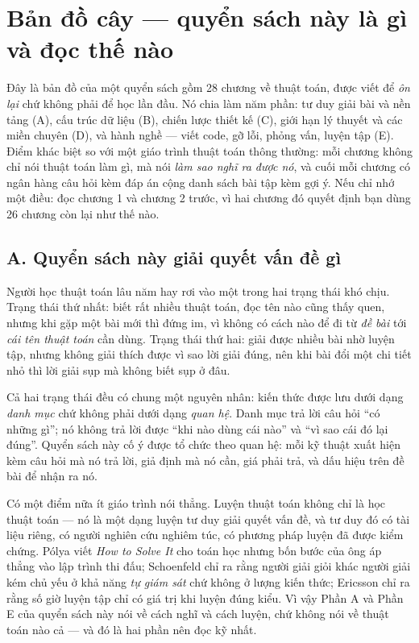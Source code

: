 \documentclass[algorithm.tex]{subfiles}
\begin{document}
\chapter*{Bản đồ cây --- quyển sách này là gì và đọc thế nào}

\begin{tomtat}
Đây là bản đồ của một quyển sách gồm 28 chương về thuật toán, được viết để \emph{ôn lại} chứ không phải để học lần đầu. Nó chia làm năm phần: tư duy giải bài và nền tảng (A), cấu trúc dữ liệu (B), chiến lược thiết kế (C), giới hạn lý thuyết và các miền chuyên (D), và hành nghề --- viết code, gỡ lỗi, phỏng vấn, luyện tập (E). Điểm khác biệt so với một giáo trình thuật toán thông thường: mỗi chương không chỉ nói thuật toán làm gì, mà nói \emph{làm sao nghĩ ra được nó}, và cuối mỗi chương có ngân hàng câu hỏi kèm đáp án cộng danh sách bài tập kèm gợi ý. Nếu chỉ nhớ một điều: đọc chương 1 và chương 2 trước, vì hai chương đó quyết định bạn dùng 26 chương còn lại như thế nào.
\end{tomtat}

\section*{A. Quyển sách này giải quyết vấn đề gì}

Người học thuật toán lâu năm hay rơi vào một trong hai trạng thái khó chịu. Trạng thái thứ nhất: biết rất nhiều thuật toán, đọc tên nào cũng thấy quen, nhưng khi gặp một bài mới thì đứng im, vì không có cách nào để đi từ \emph{đề bài} tới \emph{cái tên thuật toán} cần dùng. Trạng thái thứ hai: giải được nhiều bài nhờ luyện tập, nhưng không giải thích được vì sao lời giải đúng, nên khi bài đổi một chi tiết nhỏ thì lời giải sụp mà không biết sụp ở đâu.

Cả hai trạng thái đều có chung một nguyên nhân: kiến thức được lưu dưới dạng \emph{danh mục} chứ không phải dưới dạng \emph{quan hệ}. Danh mục trả lời câu hỏi ``có những gì''; nó không trả lời được ``khi nào dùng cái nào'' và ``vì sao cái đó lại đúng''. Quyển sách này cố ý được tổ chức theo quan hệ: mỗi kỹ thuật xuất hiện kèm câu hỏi mà nó trả lời, giả định mà nó cần, giá phải trả, và dấu hiệu trên đề bài để nhận ra nó.

Có một điểm nữa ít giáo trình nói thẳng. Luyện thuật toán không chỉ là học thuật toán --- nó là một dạng luyện tư duy giải quyết vấn đề, và tư duy đó có tài liệu riêng, có người nghiên cứu nghiêm túc, có phương pháp luyện đã được kiểm chứng. Pólya viết \emph{How to Solve It} cho toán học nhưng bốn bước của ông áp thẳng vào lập trình thi đấu; Schoenfeld chỉ ra rằng người giải giỏi khác người giải kém chủ yếu ở khả năng \emph{tự giám sát} chứ không ở lượng kiến thức; Ericsson chỉ ra rằng số giờ luyện tập chỉ có giá trị khi luyện đúng kiểu. Vì vậy Phần A và Phần E của quyển sách này nói về cách nghĩ và cách luyện, chứ không nói về thuật toán nào cả --- và đó là hai phần nên đọc kỹ nhất.
\end{document}
